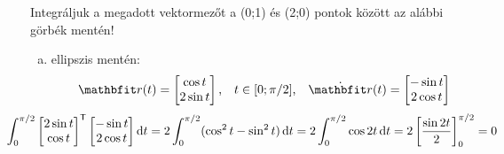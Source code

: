 \documentclass[exercise]{math-standalone}
\begin{document}
\begin{exercise}{%
    Integráljuk a megadott vektormezőt a (0;1) és (2;0) pontok között az alábbi
    görbék mentén!
  }
{\begin{enumerate}[a)]
      \item ellipszis mentén:
            \[
              \rvec r(t) = \begin{bmatrix}
                \cos t \\ 2 \sin t
              \end{bmatrix}
              \text,\quad
              t \in [0; \pi/2]
              \text,\quad
              \dot{\rvec r}(t) = \begin{bmatrix}
                - \sin t \\ 2 \cos t
              \end{bmatrix}
            \]
            \[
              \hspace{-1.3cm}
              \int_0^{\pi / 2} \begin{bmatrix}
                2 \sin t \\ \cos t
              \end{bmatrix}^\transpose
              \begin{bmatrix}
                - \sin t \\ 2 \cos t
              \end{bmatrix}
              \diff t
              = 2 \int_0^{\pi / 2} (\cos^2 t - \sin^2 t) \, \diff t
              = 2 \int_0^{\pi / 2} \cos 2t \, \diff t
              = 2 \left[ \frac{\sin 2t}{2} \right]_0^{\pi / 2}
              = 0
            \]
    \end{enumerate}
  }
\end{exercise}
\end{document}
